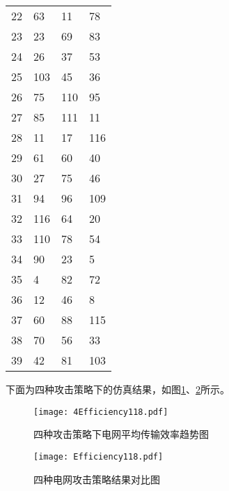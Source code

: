 \begin{table}[H]
\begin{tabular}{C{3cm}C{3cm}C{3cm}C{4cm}}
        22      & 63                 & 11                 & 78 \\
        23      & 23                 & 69                 & 83 \\
        24      & 26                 & 37                 & 53 \\
        25      & 103                & 45                 & 36 \\
        26      & 75                 & 110                 & 95 \\
        27      & 85                 & 111                 & 11 \\
        28      & 11                 & 17                 & 116 \\
        29      & 61                 & 60                 & 40 \\
        30      & 27                 & 75                 & 46 \\
        31      & 94                 & 96                 & 109 \\
        32      & 116                 & 64                 & 20 \\
        33      & 110                 & 78                 & 54 \\
        34      & 90                 & 23                 & 5 \\
        35      & 4                 & 82                 & 72 \\
        36      & 12                 & 46                 & 8 \\
        37      & 60                & 88                 & 115 \\
        38      & 70                 & 56                 & 33 \\
        39      & 42                & 81                 & 103 \\
        \bottomrule
      \end{tabular}
\end{table}

下面为四种攻击策略下的仿真结果，如图\ref{fig:chap5:4Efficiency118}、\ref{fig:chap5:Efficiency118}所示。
\begin{figure}[H] %
  \centering
  \texttt{[image: 4Efficiency118.pdf]}
  \caption{四种攻击策略下电网平均传输效率趋势图}
  \label{fig:chap5:4Efficiency118}
\end{figure}
\begin{figure}[H] %
  \centering
  \texttt{[image: Efficiency118.pdf]}
  \caption{四种电网攻击策略结果对比图}
  \label{fig:chap5:Efficiency118}
\end{figure}

